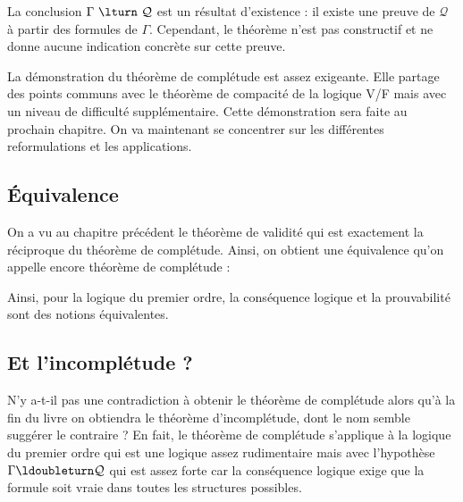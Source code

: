 \documentclass[11pt,class=report,crop=false]{standalone}
\begin{document}
La conclusion $\Gamma \ \lturn \ \mathcal{Q}$ est un résultat d'existence : \og{}il existe une preuve de $\mathcal{Q}$ à partir des formules de $\Gamma$\fg{}. Cependant, le théorème n'est pas constructif et ne donne aucune indication concrète sur cette preuve.

La démonstration du théorème de complétude est assez exigeante. Elle partage des points communs avec le théorème de compacité de la logique V/F mais avec un niveau de difficulté supplémentaire.
Cette démonstration sera faite au prochain chapitre. On va maintenant se concentrer sur les différentes reformulations et les applications.

\subsection{Équivalence}

On a vu au chapitre précédent le théorème de validité qui est exactement la réciproque du théorème de complétude.
Ainsi, on obtient une équivalence qu'on appelle encore théorème de complétude :

\begin{theoreme}
	\sauteligne
{}
\end{theoreme}

Ainsi, pour la logique du premier ordre, la conséquence logique et la prouvabilité sont des notions équivalentes.



\subsection{Et l'incomplétude ?}

N'y a-t-il pas une contradiction à obtenir le théorème de complétude alors qu'à la fin du livre on obtiendra le théorème d'incomplétude, dont le nom semble suggérer le contraire ?
En fait, le théorème de complétude s'applique à la logique du premier ordre qui est une logique assez rudimentaire mais avec l'hypothèse $\Gamma \ldoubleturn \mathcal{Q}$ qui est assez forte car 
la conséquence logique exige que la formule soit vraie dans toutes les structures possibles.
\end{document}
